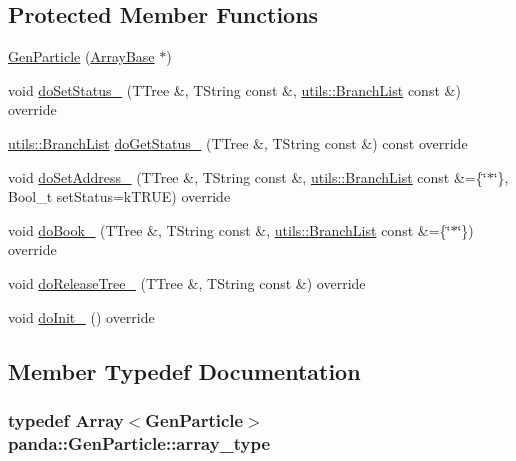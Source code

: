 \subsection*{Protected Member Functions}
\begin{DoxyCompactItemize}
\item 
\hyperlink{classpanda_1_1GenParticle_ab10d7da92ebc75ab1fadc9c6f282c1ed}{GenParticle} (\hyperlink{classpanda_1_1ArrayBase}{ArrayBase} $\ast$)
\item 
void \hyperlink{classpanda_1_1GenParticle_a41d0169feced73ebddb43bf9547cecdf}{doSetStatus\_\-} (TTree \&, TString const \&, \hyperlink{classpanda_1_1utils_1_1BranchList}{utils::BranchList} const \&) override
\item 
\hyperlink{classpanda_1_1utils_1_1BranchList}{utils::BranchList} \hyperlink{classpanda_1_1GenParticle_a117dbbc192b9795838cbfbc75f0eceb8}{doGetStatus\_\-} (TTree \&, TString const \&) const override
\item 
void \hyperlink{classpanda_1_1GenParticle_a05d969dcffe56d821bb1b73bdb084d6c}{doSetAddress\_\-} (TTree \&, TString const \&, \hyperlink{classpanda_1_1utils_1_1BranchList}{utils::BranchList} const \&=\{\char`\"{}$\ast$\char`\"{}\}, Bool\_\-t setStatus=kTRUE) override
\item 
void \hyperlink{classpanda_1_1GenParticle_aae66df460d70150e146dd95392c7e781}{doBook\_\-} (TTree \&, TString const \&, \hyperlink{classpanda_1_1utils_1_1BranchList}{utils::BranchList} const \&=\{\char`\"{}$\ast$\char`\"{}\}) override
\item 
void \hyperlink{classpanda_1_1GenParticle_a7e328cf82b58dcdf43f008066e42e451}{doReleaseTree\_\-} (TTree \&, TString const \&) override
\item 
void \hyperlink{classpanda_1_1GenParticle_a962c22c6afb1e9d0ef23eb70cfc809b5}{doInit\_\-} () override
\end{DoxyCompactItemize}


\subsection{Member Typedef Documentation}
\hypertarget{classpanda_1_1GenParticle_acacbe638e5f065cfe0d3bc8ca5ecd5ee}{
\subsubsection[{array\_\-type}]{\setlength{\rightskip}{0pt plus 5cm}typedef {\bf Array}$<${\bf GenParticle}$>$ {\bf panda::GenParticle::array\_\-type}}}
\label{classpanda_1_1GenParticle_acacbe638e5f065cfe0d3bc8ca5ecd5ee}



